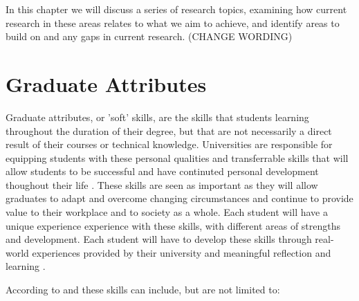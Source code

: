 \documentclass{l4proj}
\begin{document}
In this chapter we will discuss a series of research topics, examining how current research in these areas relates to what we aim 
to achieve, and identify areas to build on and any gaps in current research. (CHANGE WORDING)

\section{Graduate Attributes}

Graduate attributes, or 'soft' skills, are the skills that students learning throughout the duration of their degree, but that are not 
necessarily a direct result of their courses or technical knowledge. Universities are responsible for equipping students with these personal qualities and 
transferrable skills that will allow students to be successful and have continuted personal development thoughout their life 
\citep{stirling_graduate_nodate}. These skills are seen as important as they will allow graduates to adapt and overcome changing 
circumstances and continue to provide value to their workplace and to society as a whole. Each student will have a unique experience
experience with these skills, with different areas of strengths and development. Each student will have to develop these skills through
real-world experiences provided by their university and meaningful reflection and learning \citep{edinburgh_definition_skills}.

According to \citet{litchfield_contextualising_2010} and \citet{stevens_industry_2016} these skills can include, but are not limited to: 
\end{document}
